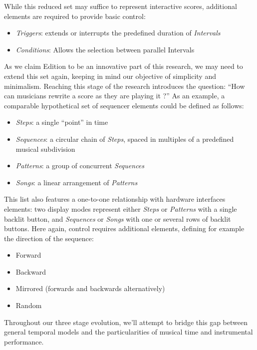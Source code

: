 \documentclass[journal,onecolumn]{IEEEtran}
\begin{document}
While this reduced set may suffice to represent interactive scores, additional elements are required to provide basic control:
\begin{itemize}
    \item \textit{Triggers}: extends or interrupts the predefined duration of \textit{Intervals}
    \item \textit{Conditions}: Allows the selection between parallel Intervals
\end{itemize}
As we claim Edition to be an innovative part of this research, we may need to extend this set again, keeping in mind our objective of simplicity and minimalism. Reaching this stage of the research introduces the question: ``How can musicians rewrite a score as they are playing it ?''
As an example, a comparable hypothetical set of sequencer elements could be defined as follows:
\begin{itemize}
    \item \textit{Steps}: a single ``point'' in time
    \item \textit{Sequences}: a circular chain of \textit{Steps}, spaced in multiples of a predefined musical subdivision
    \item \textit{Patterns}: a group of concurrent \textit{Sequences}
    \item \textit{Songs}: a linear arrangement of \textit{Patterns}
\end{itemize}
This list also features a one-to-one relationship with hardware interfaces elements: two display modes represent either \textit{Steps} or \textit{Patterns} with a single backlit button, and \textit{Sequences} or \textit{Songs} with one or several rows of backlit buttons.
Here again, control requires additional elements, defining for example the direction of the sequence:
\begin{itemize}
    \item Forward
    \item Backward
    \item Mirrored (forwards and backwards alternatively)
    \item Random
\end{itemize}
Throughout our three stage evolution, we'll attempt to bridge this gap between general temporal models and the particularities of musical time and instrumental performance. 

\end{document}
